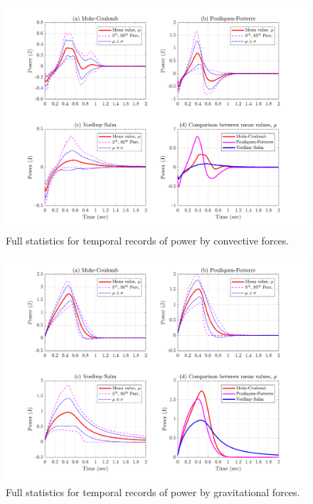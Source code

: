 \documentclass{article}
\begin{document}
\begin{figure}[H]
        \centering
        \includegraphics[width=1\textwidth]{InclinedPlane/GlobalRecords/Pconv.png}
        \caption{Full statistics for temporal records of power by convective forces.}
        \label{fig:Ramp-Pconv}
\end{figure}

\begin{figure}[H]
        \centering
        \includegraphics[width=1\textwidth]{InclinedPlane/GlobalRecords/Pgrav.png}
        \caption{Full statistics for temporal records of power by gravitational forces.}
        \label{fig:Ramp-Pgrav}
\end{figure}
\end{document}
